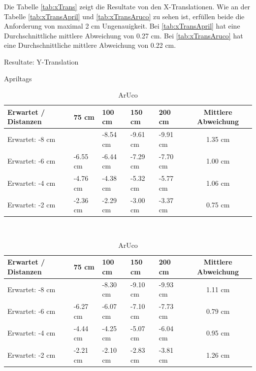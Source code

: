 Die Tabelle \ref{tab:xTrans} zeigt die Resultate von den X-Translationen. 
Wie an der Tabelle \ref{tab:xTransApril} und \ref{tab:xTransAruco} zu sehen ist, erfüllen beide die Anforderung von maximal 2 cm Ungenauigkeit.
Bei \ref{tab:xTransApril} hat eine Durchschnittliche mittlere Abweichung von 0.27 cm. 
Bei \ref{tab:xTransAruco} hat eine Durchschnittliche mittlere Abweichung von 0.22 cm. 

\begin{table}[!htb]
    \caption{Resultate: Y-Translation}
    \label{tab:yTrans}
    \begin{subtable}{.5\linewidth}
        \caption{Apriltags}
        \label{tab:yTransApriltag}
        \begin{tabular}{|l|l|l|l|l|c|}
            \hline
            Erwartet / Distanzen & 75 cm & 100 cm & 150 cm & 200 cm & Mittlere Abweichung\\
            \hline
            Erwartet:   -8 cm &          & -8.54 cm & -9.61 cm & -9.91 cm & 1.35 cm\\
            \hline
            Erwartet:   -6 cm & -6.55 cm & -6.44 cm  & -7.29 cm & -7.70 cm & 1.00 cm\\
            \hline
            Erwartet:   -4 cm & -4.76 cm & -4.38 cm & -5.32 cm & -5.77 cm & 1.06 cm\\
            \hline
            Erwartet:   -2 cm & -2.36 cm  & -2.29 cm & -3.00 cm & -3.37 cm & 0.75 cm\\
            \hline
        \end{tabular}
    \end{subtable}
    \\[\smallskipamount]
    \begin{subtable}{.5\linewidth}
        \caption{ArUco}
        \label{tab:yTransAruco}
            \begin{tabular}{|l|l|l|l|l|c|}
            \hline
            Erwartet / Distanzen & 75 cm & 100 cm & 150 cm & 200 cm & Mittlere Abweichung \\
            \hline
            Erwartet:   -8 cm &          & -8.30 cm & -9.10 cm & -9.93 cm & 1.11 cm \\
            \hline
            Erwartet:   -6 cm & -6.27 cm  & -6.07 cm & -7.10 cm & -7.73 cm & 0.79 cm\\
            \hline
            Erwartet:   -4 cm & -4.44 cm & -4.25 cm & -5.07 cm & -6.04 cm & 0.95 cm \\
            \hline
            Erwartet:   -2 cm & -2.21 cm & -2.10 cm  & -2.83 cm & -3.81 cm & 1.26 cm\\
            \hline
        \end{tabular}
    \end{subtable} 
\end{table}

